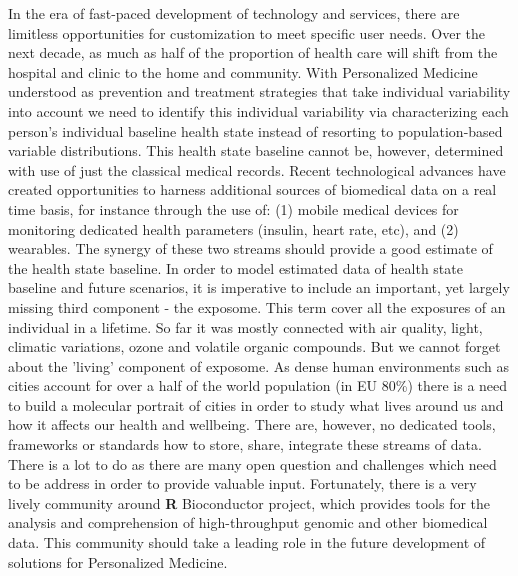 \documentclass[11pt, a4paper]{article}
\begin{document}
In the era of fast-paced development of technology and services, there
are limitless opportunities for customization to meet specific user
needs. Over the next decade, as much as half of the proportion of health
care will shift from the hospital and clinic to the home and community.
With Personalized Medicine understood as prevention and treatment
strategies that take individual variability into account we need to
identify this individual variability via characterizing each person's
individual baseline health state instead of resorting to
population-based variable distributions. This health state baseline
cannot be, however, determined with use of just the classical medical
records. Recent technological advances have created opportunities to
harness additional sources of biomedical data on a real time basis, for
instance through the use of: (1) mobile medical devices for monitoring
dedicated health parameters (insulin, heart rate, etc), and (2)
wearables. The synergy of these two streams should provide a good
estimate of the health state baseline. In order to model estimated data
of health state baseline and future scenarios, it is imperative to
include an important, yet largely missing third component - the
exposome. This term cover all the exposures of an individual in a
lifetime. So far it was mostly connected with air quality, light,
climatic variations, ozone and volatile organic compounds. But we cannot
forget about the 'living' component of exposome. As dense human
environments such as cities account for over a half of the world
population (in EU 80\%) there is a need to build a molecular portrait of
cities in order to study what lives around us and how it affects our
health and wellbeing. There are, however, no dedicated tools, frameworks
or standards how to store, share, integrate these streams of data. There
is a lot to do as there are many open question and challenges which need
to be address in order to provide valuable input. Fortunately, there is
a very lively community around \textbf{R} Bioconductor project, which
provides tools for the analysis and comprehension of high-throughput
genomic and other biomedical data. This community should take a leading
role in the future development of solutions for Personalized Medicine.
\end{document}
